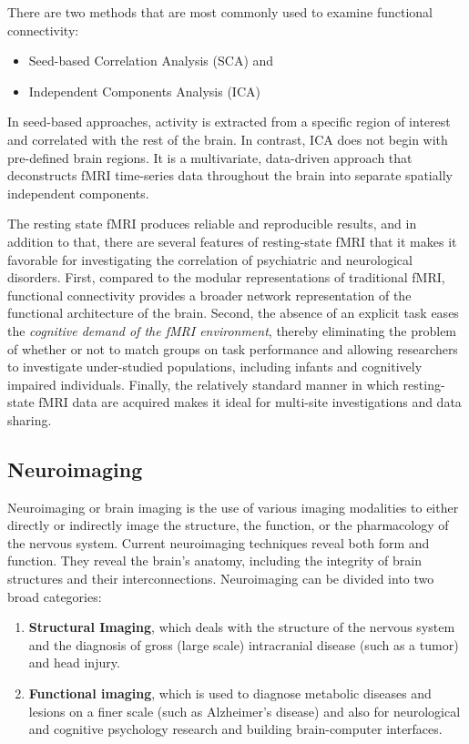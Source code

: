 \documentclass{article}
\begin{document}
There are two methods that are most commonly used to examine
functional connectivity:
\begin{itemize}[nosep]
  \item Seed-based Correlation Analysis (SCA) and
  \item Independent Components Analysis (ICA)
\end{itemize}

In seed-based approaches, activity is extracted from a specific region
of interest and correlated with the rest of the brain. In contrast,
ICA does not begin with pre-defined brain regions. It is a
multivariate, data-driven approach that deconstructs fMRI time-series
data throughout the brain into separate spatially independent
components.

The resting state fMRI produces reliable and reproducible results, and
in addition to that, there are several features of resting-state fMRI
that it makes it favorable for investigating the correlation of
psychiatric and neurological disorders.  First, compared to the
modular representations of traditional fMRI, functional connectivity
provides a broader network representation of the functional
architecture of the brain. Second, the absence of an explicit task
eases the \textit{cognitive demand of the fMRI environment}, thereby
eliminating the problem of whether or not to match groups on task
performance and allowing researchers to investigate under-studied
populations, including infants and cognitively impaired individuals.
Finally, the relatively standard manner in which resting-state fMRI
data are acquired makes it ideal for multi-site investigations and
data sharing.

\subsection{Neuroimaging}

Neuroimaging or brain imaging is the use of various imaging modalities
to either directly or indirectly image the structure, the function, or
the pharmacology of the nervous system. Current neuroimaging
techniques reveal both form and function. They reveal the brain's
anatomy, including the integrity of brain structures and their
interconnections. Neuroimaging can be divided into two broad
categories:

\begin{enumerate}

  \item \textbf{Structural Imaging}, which deals with the structure of
    the nervous system and the diagnosis of gross (large scale)
    intracranial disease (such as a tumor) and head injury.

  \item \textbf{Functional imaging}, which is used to diagnose
    metabolic diseases and lesions on a finer scale (such as
    Alzheimer's disease) and also for neurological and cognitive
    psychology research and building brain-computer interfaces.

\end{enumerate}
\end{document}
